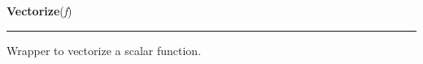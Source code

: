     \begin{boxedminipage}{\textwidth}

    \raggedright \textbf{Vectorize}(\textit{f})

    \vspace{-1.5ex}

    \rule{\textwidth}{0.5\fboxrule}

Wrapper to vectorize a scalar function.
    \vspace{1ex}

    \end{boxedminipage}

    \label{pymc:distributions:randomwrap}

    \vspace{0.5ex}

